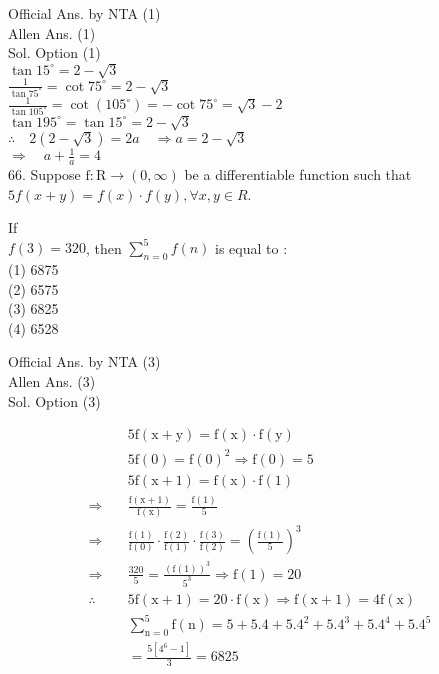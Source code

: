 \documentclass[10pt]{article}
\begin{document}
Official Ans. by NTA (1)\\
Allen Ans. (1)\\
Sol. Option (1)\\
\(\tan 15^{\circ}=2-\sqrt{3}\)\\
\(\frac{1}{\tan 75^{\circ}}=\cot 75^{\circ}=2-\sqrt{3}\)\\
\(\frac{1}{\tan 105^{\circ}}=\cot \left(105^{\circ}\right)=-\cot 75^{\circ}=\sqrt{3}-2\)\\
\(\tan 195^{\circ}=\tan 15^{\circ}=2-\sqrt{3}\)\\
\(\therefore \quad 2(2-\sqrt{3})=2 a \quad \Rightarrow a=2-\sqrt{3}\)\\
\(\Rightarrow \quad a+\frac{1}{a}=4\)\\
66. Suppose \(\mathrm{f}: \mathrm{R} \rightarrow(0, \infty)\) be a differentiable function such that \(5 f(x+y)=f(x) \cdot f(y), \forall x, y \in R\).

If\\
\(f(3)=320\), then \(\sum_{n=0}^{5} f(n)\) is equal to :\\
(1) 6875\\
(2) 6575\\
(3) 6825\\
(4) 6528

Official Ans. by NTA (3)\\
Allen Ans. (3)\\
Sol. Option (3)

\[
\begin{array}{ll} 
& 5 \mathrm{f}(\mathrm{x}+\mathrm{y})=\mathrm{f}(\mathrm{x}) \cdot \mathrm{f}(\mathrm{y}) \\
& 5 \mathrm{f}(0)=\mathrm{f}(0)^{2} \Rightarrow \mathrm{f}(0)=5 \\
& 5 \mathrm{f}(\mathrm{x}+1)=\mathrm{f}(\mathrm{x}) \cdot \mathrm{f}(1) \\
\Rightarrow & \frac{\mathrm{f}(\mathrm{x}+1)}{\mathrm{f}(\mathrm{x})}=\frac{\mathrm{f}(1)}{5} \\
\Rightarrow & \frac{\mathrm{f}(1)}{\mathrm{f}(0)} \cdot \frac{\mathrm{f}(2)}{\mathrm{f}(1)} \cdot \frac{\mathrm{f}(3)}{\mathrm{f}(2)}=\left(\frac{\mathrm{f}(1)}{5}\right)^{3} \\
\Rightarrow \quad & \frac{320}{5}=\frac{(\mathrm{f}(1))^{3}}{5^{3}} \Rightarrow \mathrm{f}(1)=20 \\
\therefore \quad & 5 \mathrm{f}(\mathrm{x}+1)=20 \cdot \mathrm{f}(\mathrm{x}) \Rightarrow \mathrm{f}(\mathrm{x}+1)=4 \mathrm{f}(\mathrm{x}) \\
& \sum_{\mathrm{n}=0}^{5} \mathrm{f}(\mathrm{n})=5+5.4+5.4^{2}+5.4^{3}+5.4^{4}+5.4^{5} \\
& =\frac{5\left[4^{6}-1\right]}{3}=6825
\end{array}
\]
\end{document}
